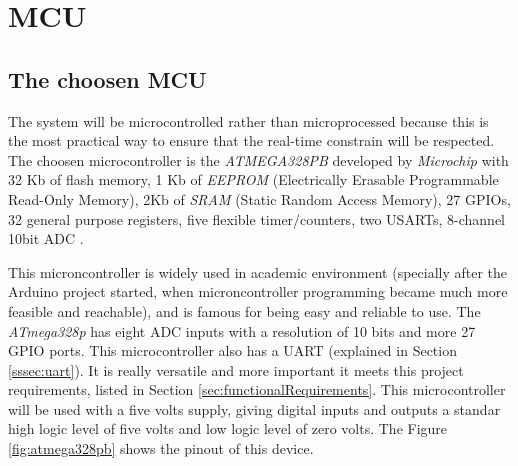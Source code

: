 \section{MCU}\label{sec:mcu-hw}

		\subsection{The choosen MCU}\label{ssec:the-choosen-mcu}

		The system will be microcontrolled rather than microprocessed because this is the most practical way to ensure that the real-time constrain will be respected. The choosen microcontroller is the \textit{ATMEGA328PB} developed by \textit{Microchip} with 32 Kb of flash memory, 1 Kb of \textit{EEPROM} (Electrically Erasable Programmable Read-Only Memory), 2Kb of \textit{SRAM} (Static Random Access Memory), 27 GPIOs, 32 general purpose registers, five flexible timer/counters, two USARTs, 8-channel 10bit ADC \cite{atmega328p-datasheet}. 
		\par
		This microncontroller is widely used in academic environment (specially after the Arduino project started, when microncontroller programming became much more feasible and reachable), and is famous for being easy and reliable to use. The \textit{ATmega328p} has eight ADC inputs with a resolution of 10 bits and more 27 GPIO ports. This microcontroller also has a UART (explained in Section \ref{sssec:uart}). It is really versatile and more important it meets this project requirements, listed in Section \ref{sec:functionalRequirements}. This microcontroller will be used with a five volts supply, giving digital inputs and outputs a standar high logic level of five volts and low logic level of zero volts. The Figure \ref{fig:atmega328pb} shows the pinout of this device.

